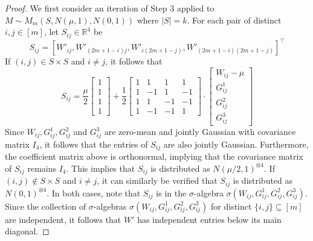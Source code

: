 \documentclass[11pt]{article}
\begin{document}
\begin{proof}
We first consider an iteration of Step 3 applied to $M \sim M_m(S, N(\mu, 1), N(0, 1))$ where $|S| = k$. For each pair of distinct $i, j \in [m]$, let $S_{ij} \in \mathbb{R}^4$ be
$$S_{ij} = \left[ W'_{ij}, W'_{(2m+1-i)j}, W'_{i(2m+1-j)}, W'_{(2m+1-i)(2m+1-j)} \right]^\top$$
If $(i, j) \in S \times S$ and $i \neq j$, it follows that
$$S_{ij} = \frac{\mu}{2} \left[ \begin{matrix} 1 \\ 1 \\ 1 \\ 1 \end{matrix} \right] + \frac{1}{2} \left[ \begin{array}{rrrr} 1 & 1 & 1 & 1 \\ 1 & -1 & 1 & -1 \\ 1 & 1 & -1 & -1 \\ 1 & -1 & -1 & 1 \end{array} \right] \cdot \left[ \begin{matrix} W_{ij} - \mu \\ G^1_{ij} \\ G^2_{ij} \\ G^3_{ij} \end{matrix} \right]$$
Since $W_{ij}, G^1_{ij}, G^2_{ij}$ and $G^3_{ij}$ are zero-mean and jointly Gaussian with covariance matrix $I_4$, it follows that the entries of $S_{ij}$ are also jointly Gaussian. Furthermore, the coefficient matrix above is orthonormal, implying that the covariance matrix of $S_{ij}$ remains $I_4$. This implies that $S_{ij}$ is distributed as $N(\mu/2, 1)^{\otimes 4}$. If $(i, j) \not \in S \times S$ and $i \neq j$, it can similarly be verified that $S_{ij}$ is distributed as $N(0, 1)^{\otimes 4}$. In both cases, note that $S_{ij}$ is in the $\sigma$-algebra $\sigma(W_{ij}, G^1_{ij}, G^2_{ij}, G^3_{ij})$. Since the collection of $\sigma$-algebras $\sigma(W_{ij}, G^1_{ij}, G^2_{ij}, G^3_{ij})$ for distinct $\{i, j\} \subseteq [m]$ are independent, it follows that $W'$ has independent entries below its main diagonal.


\end{proof}
\end{document}
